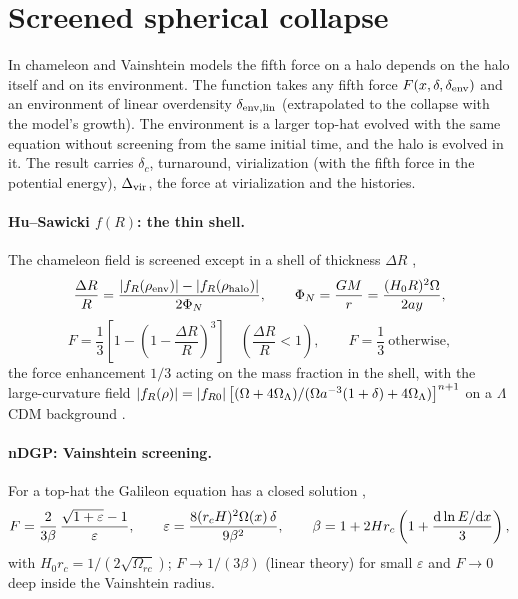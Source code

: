 \section{Screened spherical collapse}\label{sec:sc-screened}

In chameleon and Vainshtein models the fifth force on a halo depends on the halo itself and on its environment. The
function  takes any fifth force $F(x,\delta,\delta_{\rm env})$ and an environment of
linear overdensity $\delta_{\rm env,lin}$ (extrapolated to the collapse with the model's growth). The environment is a
larger top-hat evolved with the same equation without screening from the same initial time, and the halo is evolved in it.
The result carries $\delta_c$, turnaround, virialization (with the fifth force in the potential energy), $\Delta_{\rm vir}$,
the force at virialization and the histories.

\paragraph*{Hu--Sawicki $f(R)$: the thin shell.} The chameleon field is screened except in a shell of thickness $\Delta R$
\cite{Schmidt2010,Lombriser2014},
\begin{equation}
\frac{\Delta R}{R}=\frac{|f_R(\rho_{\rm env})|-|f_R(\rho_{\rm halo})|}{2\Phi_N},\qquad
\Phi_N=\frac{GM}{r}=\frac{(H_0R)^2\Omega}{2ay},
\end{equation}
\begin{equation}
F=\frac13\left[1-\left(1-\frac{\Delta R}{R}\right)^3\right]\quad\left(\frac{\Delta R}{R}<1\right),\qquad F=\frac13\ \text{otherwise},
\end{equation}
the force enhancement $1/3$ acting on the mass fraction in the shell, with the large-curvature field
$|f_R(\rho)|=|f_{R0}|\left[(\Omega+4\Omega_\Lambda)/(\Omega a^{-3}(1+\delta)+4\Omega_\Lambda)\right]^{n+1}$ on a $\Lambda$CDM
background \cite{HuSawicki2007}.

\paragraph*{nDGP: Vainshtein screening.} For a top-hat the Galileon equation has a closed solution \cite{Schmidt2010},
\begin{equation}
F=\frac{2}{3\beta}\,\frac{\sqrt{1+\varepsilon}-1}{\varepsilon},\qquad
\varepsilon=\frac{8(r_cH)^2\Omega(x)\,\delta}{9\beta^2},\qquad
\beta=1+2Hr_c\left(1+\frac{\mathrm{d}\ln E/\mathrm{d} x}{3}\right),
\end{equation}
with $H_0r_c=1/(2\sqrt{\Omega_{rc}})$; $F\to1/(3\beta)$ (linear theory) for small $\varepsilon$ and $F\to0$ deep inside the
Vainshtein radius.

